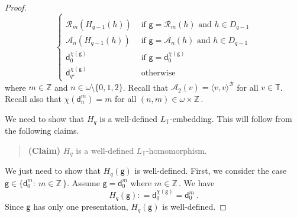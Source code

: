 \documentclass[10pt,a4paper, openany,  oldfontcommands]{memoir}
\newtheorem{open problem} [theorem] {Open Problem}
\newtheorem{open question} [theorem] {Open Question}
\begin{document}
\begin{proof}
\[\begin{cases}
 \\
  \mathcal{R}_m  \left( H_{ q-1} ( h )     \right)          &   \mbox{ if  }   \mathsf{g}   =  \mathcal{R}_m  \left(  h     \right) 
             \mbox{  and  }     h  \in   D_{ q-1 }   
 \\
   \mathcal{A}_n  \left( H_{ q-1} ( h )     \right)          &   \mbox{ if  }   \mathsf{g}   =  \mathcal{A}_n  \left(  h     \right) 
                \mbox{  and  }     h  \in   D_{ q-1 }   
 \\
\mathsf{d}^{   \chi \left(  \mathsf{g}  \right)   }_0                        
                                                    &   \mbox{ if  }   \mathsf{g}   =  \mathsf{d}_0^{    \chi \left(  \mathsf{g}  \right)  }
 \\
  \mathsf{d}_{ q^{  \star } }^{     \chi \left(  \mathsf{g}  \right)     }      &    \mbox{ otherwise}     
\end{cases}
\]
where  $  m  \in  \mathbb{Z}  $  and    $  n  \in  \omega  \setminus  \lbrace 0, 1 ,  2  \rbrace   $. 
Recall that  $  \mathcal{A}_2  (v)  =  \langle  v,  v  \rangle^{  \mathcal{B}  }  $  for all $  v  \in  \mathbb{T}  $.
Recall also that  $  \chi  \left(   \mathsf{d}^m_n \right)  =  m  $  for all  $  (n,m)  \in    \omega  \times  \mathbb{Z}      \,     $. 










  
We need to show  that       $  H_q  $ is a well-defined   $ L_{  \mathbb{T} } $-embedding. 
This  will follow from the following   claims. 


   \begin{quote} {\bf (Claim)} \;\;\;\;\;\;    
$  H_q  $  is  a well-defined    $ L_{  \mathbb{T} } $-homomorphism. 
 \end{quote}  
 
 
 We just need to show that  $  H_q   \left(   \mathsf{g}   \right)  $  is well-defined.
First, we consider the case     $    \mathsf{g}   \in  \big\{   \mathsf{d}^m_0   :   \    m   \in    \mathbb{Z}  \,   \big\}  $. 
Assume    $   \mathsf{g}   =   \mathsf{d}^{  m }_0   $   where   $  m  \in  \mathbb{Z}        \,   $. 
We have  
\[
 H_q   \left(   \mathsf{g}   \right)   : =  
 \mathsf{d}_0^{    \chi \left(  \mathsf{g}  \right)  }        =     \mathsf{d}^{  m }_0
  \        .
\]
Since   $  \mathsf{g}   $  has only one presentation,    $  H_q   \left(   \mathsf{g}   \right)  $  is well-defined.


\end{proof}
\end{document}
